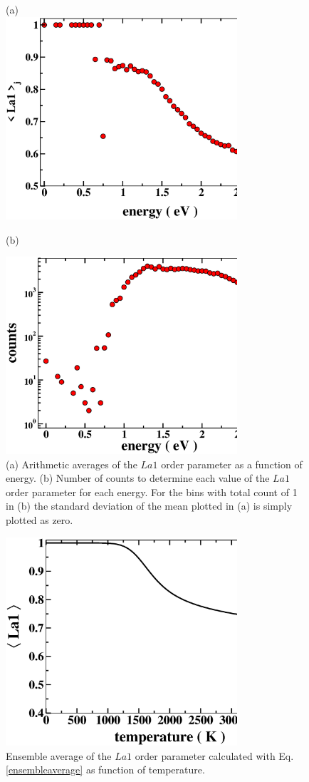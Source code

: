 \documentclass[aps,pre,reprint,superscriptaddress,showkeys]{revtex4-2}
\begin{document}
\begin{figure}[h!]
(a)\\
\includegraphics[width=8.6cm]{fig8a.eps}\\
\centerline{(b)}
\includegraphics[width=8.6cm]{fig8b.eps}
\caption{(a) Arithmetic averages of the $La1$ order parameter as a function of energy.  (b) Number of counts to determine each value of the $La1$ order parameter for each energy. For the bins with total count of 1 in (b) the standard deviation of the mean plotted in (a) is simply plotted as zero.  \label{arithemetic_avg}}
\end{figure}

\begin{figure}[h!]
\includegraphics[width=8.6cm]{fig9.eps}
\caption{Ensemble average of the $La1$ order parameter calculated with Eq. \ref{ensembleaverage} as function of temperature. \label{ensembleOP}}
\end{figure}
\end{document}
